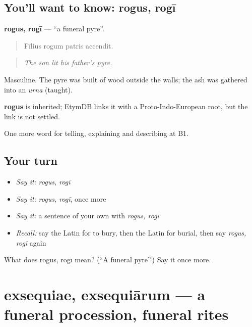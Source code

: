 \subsection*{You'll want to know: rogus, rogī}
\textbf{rogus, rogī} — \textquotedblleft{}a funeral pyre\textquotedblright{}.

\begin{quote}
Fīlius rogum patris accendit.
\end{quote}

\begin{quote}
\emph{The son lit his father's pyre.}
\end{quote}

Masculine. The pyre was built of wood outside the walls; the ash was gathered into an \emph{urna} (taught).

\begin{cousinweb}
\textbf{rogus} is inherited; EtymDB links it with a Proto-Indo-European root, but the link is not settled.
\end{cousinweb}

\begin{grammarlens}[title={What you've built}]
One more word for telling, explaining and describing at B1.
\end{grammarlens}

\subsection*{Your turn}
\begin{itemize}
\raggedright
  \item \emph{Say it:} \emph{rogus, rogī}
  \item \emph{Say it:} \emph{rogus, rogī}, once more
  \item \emph{Say it:} a sentence of your own with \emph{rogus, rogī}
  \item \emph{Recall:} say the Latin for to bury, then the Latin for burial, then say \emph{rogus, rogī} again
\end{itemize}

\begin{tcolorbox}[breakable,colback=teal!4,colframe=teal!35!black,title={Before you move on}]
What does rogus, rogī mean? (\textquotedblleft{}A funeral pyre\textquotedblright{}.) Say it once more.
\end{tcolorbox}
\section[exsequiae, exsequiārum]{exsequiae, exsequiārum — a funeral procession, funeral rites}

